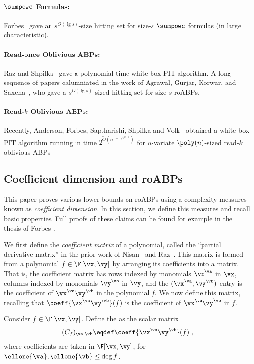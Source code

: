 \documentclass{toc}
\begin{document}
\paragraph{$\sumpowc$ Formulas:} Forbes~\cite{Forbes15} gave an $s^{O(\lg s)}$-size hitting set for size-$s$ $\sumpowc$ formulas (in large characteristic).

\paragraph{Read-once Oblivious ABPs:} Raz and Shpilka~\cite{RazShpilka05} gave a %
polynomial-time   %
white-box PIT algorithm. A long sequence of papers calumniated in the work of Agrawal, Gurjar, Korwar, and Saxena~\cite{AgrawalGKS15}, who gave a $s^{O(\lg s)}$-sized hitting set for size-$s$ roABPs.

\paragraph{Read-$k$ Oblivious ABPs:} Recently, Anderson, Forbes, Saptharishi, Shpilka and Volk~\cite{AndersonFSSV16} obtained a white-box PIT algorithm running in time $2^{\tilde{O}(n^{1-1/2^{k-1}})}$ for $n$-variate $\poly(n)$-sized read-$k$ oblivious ABPs.

\subsection{Coefficient dimension and roABPs}\label{sec:coeff-dim}

This paper proves various lower bounds on roABPs using a complexity measures known as \emph{coefficient dimension}.  In this section, we define this measures and recall basic properties. Full proofs of these claims can be found for example in the thesis of Forbes~\cite{Forbes14}.

We first define the \emph{coefficient matrix} of a polynomial, called the ``partial derivative matrix'' in the prior work of Nisan~\cite{Nisan91} and Raz~\cite{Raz09}. This matrix is formed from a polynomial $f\in\F[\vx,\vy]$ by arranging its coefficients into a matrix.  That is, the coefficient matrix has rows indexed by monomials $\vx^\va$ in $\vx$, columns indexed by monomials $\vy^\vb$ in $\vy$, and the $(\vx^\va,\vy^\vb)$-entry is the coefficient of $\vx^\va\vy^\vb$ in the polynomial $f$.  We now define this matrix, recalling that $\coeff{\vx^\va\vy^\vb}(f)$ is the coefficient of $\vx^\va\vy^\vb$ in $f$.

\begin{definition}
        Consider $f\in\F[\vx,\vy]$.  Define the  as the scalar matrix
        \[
                (C_f)_{\va,\vb}
                \eqdef
                \coeff{\vx^\va\vy^\vb}(f)
                \;,
        \]
        where coefficients are taken in $\F[\vx,\vy]$, for $\ellone{\va},\ellone{\vb}\le \deg f$.
\end{definition}
\end{document}
